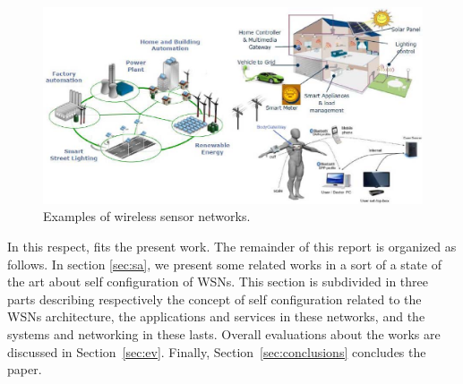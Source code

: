 \begin{figure}[t]
\vspace{-4mm}
\centering
 \includegraphics[width=\columnwidth]{eps/fig}
 \vspace{-4mm} 
 \caption{Examples of wireless sensor networks.}
 \vspace{-4mm}
  \label{fig:scenario}
\end{figure}


In this respect, fits the present work.
The remainder of this report is organized as follows. In section
\ref{sec:sa}, we present some related works in a sort of a state of the art
about self configuration of WSNs. This section is subdivided in three parts
describing respectively the concept of self configuration related to the WSNs architecture, the applications and services in these networks, and the systems
and networking in these lasts. Overall evaluations about the works are
discussed in Section~\ref{sec:ev}. Finally, Section~\ref{sec:conclusions} concludes the paper.
